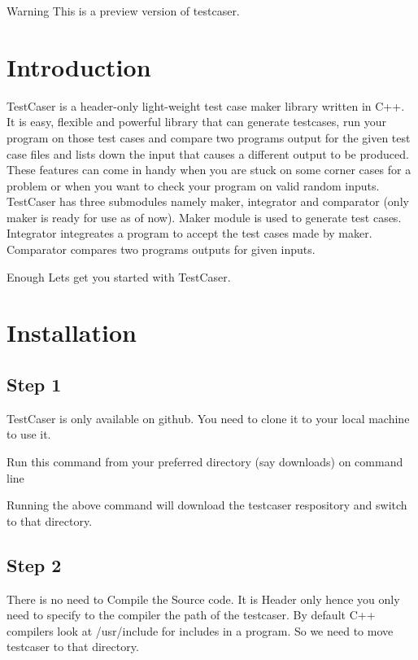 \begin{DoxyWarning}{Warning}
This is a preview version of testcaser.
\end{DoxyWarning}
\hypertarget{index_sec_intro}{}\section{Introduction}\label{index_sec_intro}
Test\+Caser is a header-\/only light-\/weight test case maker library written in C++. It is easy, flexible and powerful library that can generate testcases, run your program on those test cases and compare two program\textquotesingle{}s output for the given test case files and lists down the input that causes a different output to be produced. These features can come in handy when you are stuck on some corner cases for a problem or when you want to check your program on valid random inputs. Test\+Caser has three submodules namely maker, integrator and comparator (only maker is ready for use as of now). Maker module is used to generate test cases. Integrator integreates a program to accept the test cases made by maker. Comparator compares two program\textquotesingle{}s outputs for given inputs.

Enough Let\textquotesingle{}s get you started with Test\+Caser.\hypertarget{index_sec_install}{}\section{Installation}\label{index_sec_install}
\hypertarget{index_step1}{}\subsection{Step 1}\label{index_step1}
Test\+Caser is only available on github. You need to clone it to your local machine to use it.

Run this command from your preferred directory (say downloads) on command line 
\begin{DoxyCode}{0}
\end{DoxyCode}
 Running the above command will download the testcaser respository and switch to that directory.\hypertarget{index_step2}{}\subsection{Step 2}\label{index_step2}
There is no need to Compile the Source code. It is Header only hence you only need to specify to the compiler the path of the testcaser. By default C++ compilers look at {\ttfamily /usr/include} for includes in a program. So we need to move testcaser to that directory.

